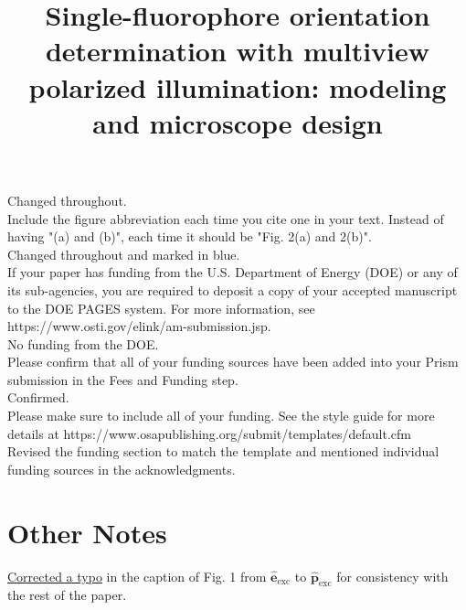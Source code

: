 \documentclass[10pt]{article}
\providecommand{\mb}[1]{\mathbf{#1}}
\begin{document}
Changed throughout.\\

{\color{OE} Include the figure abbreviation each time you cite one in your
  text. Instead of having "(a) and (b)", each time it should be "Fig. 2(a) and
  2(b)".}\\

Changed throughout and marked in blue.\\

{\color{OE} If your paper has funding from the U.S. Department of Energy (DOE)
  or any of its sub-agencies, you are required to deposit a copy of your
  accepted manuscript to the DOE PAGES system. For more information, see
  https://www.osti.gov/elink/am-submission.jsp.}\\

No funding from the DOE.\\

{\color{OE} Please confirm that all of your funding sources have been added
  into your Prism submission in the Fees and Funding step.}\\

Confirmed. \\

{\color{OE} Please make sure to include all of your funding. See the style
  guide for more details at
  https://www.osapublishing.org/submit/templates/default.cfm}\\

Revised the funding section to match the template and mentioned individual funding
sources in the acknowledgments.

\section*{Other Notes}

\hyperlink{typo}{\color{urlblue} Corrected a typo} in the caption of Fig. 1 from $\hat{\mb{e}}_{\text{exc}}$ to
$\hat{\mb{p}}_{\text{exc}}$ for consistency with the rest of the paper. 

\pagebreak

\title{Single-fluorophore orientation determination with multiview polarized
  illumination: modeling and microscope design}
\end{document}
